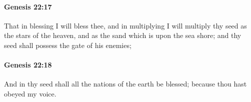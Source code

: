 		\paragraph{Genesis 22:17} %
			\label{GENESIS-22-17}

			That in blessing I will bless thee, and in multiplying I will multiply thy seed as the stars of the heaven, and as the sand which is upon the sea shore; and thy seed shall possess the gate of his enemies;


		\paragraph{Genesis 22:18} %
			\label{GENESIS-22-18}

			And in thy seed shall all the nations of the earth be blessed; because thou hast obeyed my voice.


